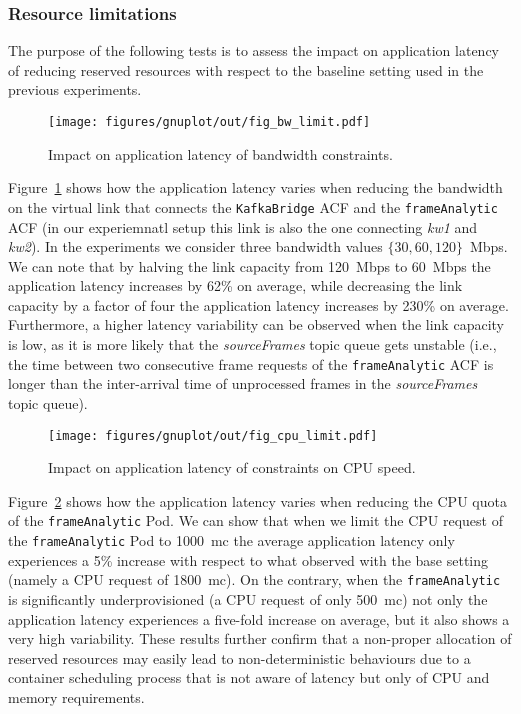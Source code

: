 \subsubsection{Resource limitations}
\label{sec:test2}
\noindent
%
The purpose of the following tests is to assess the impact on application latency of reducing reserved resources with respect to the baseline setting used in the previous experiments. 
%
\begin{figure}[ht]
    \centering
    \texttt{[image: figures/gnuplot/out/fig\_bw\_limit.pdf]}
   \caption{Impact on application latency of bandwidth constraints.}
    \label{fig:poc_res_bw}
    \vspace{-0.2cm}
\end{figure}
%
Figure~\ref{fig:poc_res_bw} shows how the application latency varies when reducing the bandwidth on the virtual link that connects the \texttt{KafkaBridge} ACF and the \texttt{frameAnalytic} ACF (in our experiemnatl setup this link is also the one connecting \textit{kw1} and \textit{kw2}). In the experiments we consider three bandwidth values $\{30,60,120\}$~Mbps. We can note that by halving the link capacity from 120~Mbps to 60~Mbps the application latency increases by 62\% on average, while decreasing the link capacity by a factor of four the application latency increases by 230\% on average. Furthermore, a higher latency variability can be observed when the link capacity is low, as it is more likely that the \textit{sourceFrames} topic queue gets unstable (i.e., the time between two consecutive frame requests of the \texttt{frameAnalytic} ACF is longer than the inter-arrival time of unprocessed frames in the \textit{sourceFrames} topic queue). 
%
\begin{figure}[ht]
    \centering
    \texttt{[image: figures/gnuplot/out/fig\_cpu\_limit.pdf]}
   \caption{Impact on application latency of constraints on CPU speed.}
    \label{fig:poc_res_cpu}
    \vspace{-0.2cm}
\end{figure}
%
Figure~\ref{fig:poc_res_cpu} shows how the application latency varies when reducing the CPU quota of the \texttt{frameAnalytic} Pod. We can show that when we limit the CPU request of the \texttt{frameAnalytic} Pod to 1000~mc the average application latency only experiences a 5\% increase with respect to what observed with the base setting (namely a CPU request of 1800~mc). On the contrary, when the \texttt{frameAnalytic} is significantly underprovisioned (a CPU request of only 500~mc) not only the  application latency experiences a five-fold increase on average, but it also shows a very high variability. These results further confirm that a non-proper allocation of reserved resources may easily lead to non-deterministic behaviours due to a container scheduling process that is not aware of latency but only of CPU and memory requirements.
%

